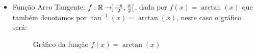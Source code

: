 \begin{itemize}
  \item Função Arco Tangente: $f: \mathbb{R} \rightarrow ]\frac{-\pi}{2}, \frac{\pi}{2}[$, dada por $f(x)= \arctan(x)$ que também denotamos por $\tan^{-1}(x)= \arctan (x)$, neste caso o gráfico será:

  \begin{figure}[H]
  \centering
    \caption{Gráfico da função $f(x)= \arctan(x)$}
  \end{figure}


  \end{itemize}
